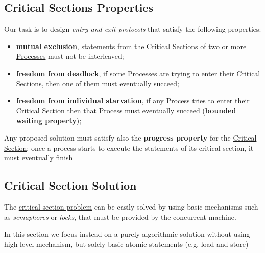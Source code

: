 \subsection{Critical Sections Properties}\label{sub:cp_critical_sections_properties} %
Our task is to design \textit{entry and exit protocols} that satisfy the following properties:
\begin{itemize}
    \item \textbf{mutual exclusion}, statements from the \hyperref[def:crit-sec]{Critical Sections} of two or more \hyperref[def:process]{Processes} must not be interleaved;
    \item \textbf{freedom from deadlock}, if some \hyperref[def:process]{Processes} are trying to enter their \hyperref[def:crit-sec]{Critical Sections}, then one of them must eventually succeed;
    \item \textbf{freedom from individual starvation}, if any \hyperref[def:process]{Process} tries to enter their \hyperref[def:crit-sec]{Critical Section} then that \hyperref[def:process]{Process} must eventually succeed (\textbf{bounded waiting property});
\end{itemize}
\begin{note}
    Any proposed solution must satisfy also the \textbf{progress property} for the  \hyperref[def:crit-sec]{Critical Section}: once a process starts to execute the statements of its critical section, it must eventually finish
    \begin{critical}
    \end{critical}
\end{note}
%
\subsection{Critical Section Solution}\label{sub:cp_critical_section_solution} %
The \hyperref[th:cs-problem]{critical section problem} can be easily solved by using basic mechanisms such as \textit{semaphores} or \textit{locks}, that must be provided by the concurrent machine.
\begin{note}
    In this section we focus instead on a purely algorithmic solution without using high-level mechanism, but solely basic atomic statements (e.g. load and store)
\end{note}
%
